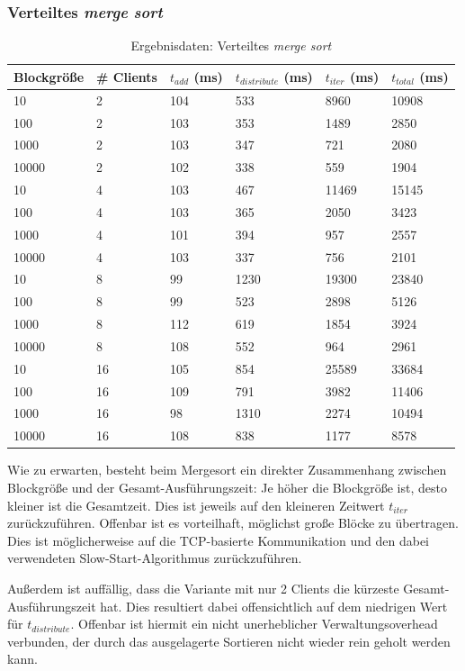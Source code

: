 \documentclass[fontsize=12pt,a4paper,headinclude=no,headings=small]{scrartcl}
\begin{document}
\subsubsection{Verteiltes \textit{merge sort}}
\begin{table}[htp]
\begin{tabularx}{\textwidth}{ |X|X|X|X|X|X| }
\hline
Blockgröße & \# Clients & $t_{add}$ (ms) & $t_{distribute}$ (ms) & $t_{iter}$ (ms) & $t_{total}$ (ms) \\
\hline
10 & 2 & 104 & 533 & 8960 & 10908 \\
100 & 2 & 103 & 353 & 1489 & 2850 \\
1000 & 2 & 103 & 347 & 721 & 2080 \\
10000 & 2 & 102 & 338 & 559 & 1904 \\
\hline
10 & 4 & 103 & 467 & 11469 & 15145 \\
100 & 4 & 103 & 365 & 2050 & 3423 \\
1000 & 4 & 101 & 394 & 957 & 2557 \\
10000 & 4 & 103 & 337 & 756 & 2101 \\
\hline
10 & 8 & 99 & 1230 & 19300 & 23840 \\
100 & 8 & 99 & 523 & 2898 & 5126 \\
1000 & 8 & 112 & 619 & 1854 & 3924 \\
10000 & 8 & 108 & 552 & 964 & 2961 \\
\hline
10 & 16 & 105 & 854 & 25589 & 33684 \\
100 & 16 & 109 & 791 & 3982 & 11406 \\
1000 & 16 & 98 & 1310 & 2274 & 10494 \\
10000 & 16 & 108 & 838 & 1177 & 8578 \\
\hline
\end{tabularx}
\caption{Ergebnisdaten: Verteiltes \textit{merge sort}}
\end{table}
Wie zu erwarten, besteht beim Mergesort ein direkter Zusammenhang zwischen Blockgröße und der Gesamt-Ausführungszeit: Je höher die Blockgröße ist, desto kleiner ist die Gesamtzeit. Dies ist jeweils auf den kleineren Zeitwert $t_{iter}$ zurückzuführen. Offenbar ist es vorteilhaft, möglichst große Blöcke zu übertragen. Dies ist möglicherweise auf die TCP-basierte Kommunikation und den dabei verwendeten Slow-Start-Algorithmus zurückzuführen.
 
Außerdem ist auffällig, dass die Variante mit nur 2 Clients die kürzeste Gesamt-Ausführungszeit hat. Dies resultiert dabei offensichtlich auf dem niedrigen Wert für $t_{distribute}$. Offenbar ist hiermit ein nicht unerheblicher Verwaltungsoverhead verbunden, der durch das ausgelagerte Sortieren nicht wieder rein geholt werden kann.
\end{document}
